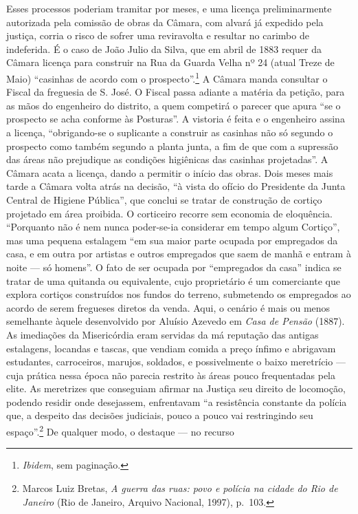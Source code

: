 Esses processos poderiam tramitar por meses, e uma licença
preliminarmente autorizada pela comissão de obras da Câmara, com alvará
já expedido pela justiça, corria o risco de sofrer uma reviravolta e
resultar no carimbo de indeferida. É o caso de João Julio da Silva, que
em abril de 1883 requer da Câmara licença para construir na Rua da
Guarda Velha nº 24 (atual Treze de Maio) ``casinhas de acordo com o
prospecto''.\footnote{\textit{Ibidem}, sem paginação.} A Câmara manda
consultar o Fiscal da freguesia de S. José. O Fiscal passa adiante a
matéria da petição, para as mãos do engenheiro do distrito, a quem
competirá o parecer que apura ``se o prospecto se acha conforme às
Posturas''. A vistoria é feita e o engenheiro assina a licença,
``obrigando-se o suplicante a construir as casinhas não só segundo o
prospecto como também segundo a planta junta, a fim de que com a
supressão das áreas não prejudique as condições higiênicas das casinhas
projetadas''. A Câmara acata a licença, dando a permitir o início das
obras. Dois meses mais tarde a Câmara volta atrás na decisão, ``à vista
do ofício do Presidente da Junta Central de Higiene Pública'', que
conclui se tratar de construção de cortiço projetado em área proibida. O
corticeiro recorre sem economia de eloquência. ``Porquanto não é nem
nunca poder-se-ia considerar em tempo algum Cortiço'', mas uma pequena
estalagem ``em sua maior parte ocupada por empregados da casa, e em
outra por artistas e outros empregados que saem de manhã e entram à
noite --- só homens''. O fato de ser ocupada por ``empregados da casa''
indica se tratar de uma quitanda ou equivalente, cujo proprietário é um
comerciante que explora cortiços construídos nos fundos do terreno,
submetendo os empregados ao acordo de serem fregueses diretos da venda.
Aqui, o cenário é mais ou menos semelhante àquele desenvolvido por
Aluísio Azevedo em \textit{Casa de Pensão} (1887). As imediações da
Misericórdia eram servidas da má reputação das antigas estalagens,
locandas e tascas, que vendiam comida a preço ínfimo e abrigavam
estudantes, carroceiros, marujos, soldados, e possivelmente o baixo
meretrício --- cuja prática nessa época não parecia restrito às áreas
pouco frequentadas pela elite. As meretrizes que conseguiam afirmar na
Justiça seu direito de locomoção, podendo residir onde desejassem,
enfrentavam ``a resistência constante da polícia que, a despeito das
decisões judiciais, pouco a pouco vai restringindo seu
espaço''.\footnote{Marcos Luiz Bretas, \textit{A guerra das ruas: povo e
  polícia na cidade do Rio de Janeiro} (Rio de Janeiro, Arquivo
  Nacional, 1997), p.~103.} De qualquer modo, o destaque --- no recurso
